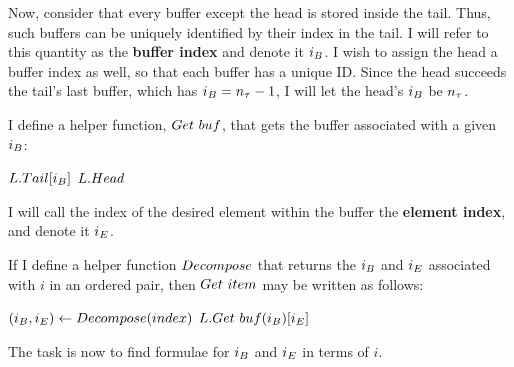 Now, consider that every buffer except the head is stored inside the tail. Thus, such buffers can be uniquely identified by their index in the tail. I will refer to this quantity as the \textbf{buffer index} and denote it $i_B$. I wish to assign the head a buffer index as well, so that each buffer has a unique ID. Since the head succeeds the tail's last buffer, which has $i_B = n_\tau - 1$, I will let the head's $i_B$ be $n_\tau$.

I define a helper function, $\FuncGetBuffer$, that gets the buffer associated with a given $i_B$:

\begin{algorithm}
	\begin{algorithmic}
		\Function{$\FuncGetBuffer$}{$\VarList, \VarIndexBuffer$}
				\State \Return $L.Tail[i_B]$
			\Else
				\State \Return $L.Head$
			\EndIf
		\EndFunction
	\end{algorithmic}
\end{algorithm}

I will call the index of the desired element within the buffer the \textbf{element index}, and denote it $i_E$.

If I define a helper function $Decompose$ that returns the $i_B$ and $i_E$ associated with $i$ in an ordered pair, then $\FuncGetItem$ may be written as follows:

\begin{algorithm}
	\begin{algorithmic}
		\Function{$\FuncGetItem$}{$\VarList, index$}
			\State $(i_B, i_E) \gets Decompose(index)$
			\State \Return $L.Get\ buf(i_B)[i_E]$
		\EndFunction
	\end{algorithmic}
\end{algorithm}

The task is now to find formulae for $i_B$ and $i_E$ in terms of $i$.